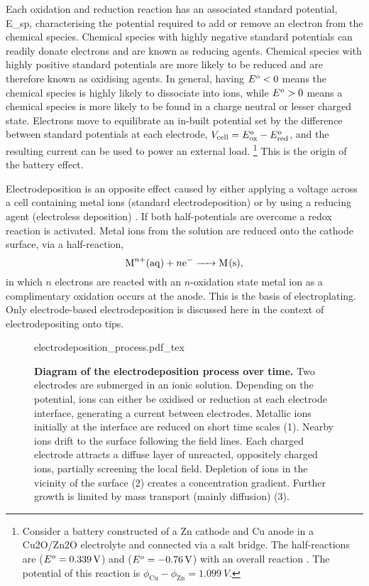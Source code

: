 \documentclass{article}
\begin{document}
Each oxidation and reduction reaction has an associated standard potential, \gls{E_sp}, characterising the  potential required to add or remove an electron from the chemical species. Chemical species with highly negative standard potentials can readily donate electrons and are known as reducing agents. Chemical species with highly positive standard potentials are more likely to be reduced and are therefore known as oxidising agents. In general, having $E^o<0$ means the chemical species is highly likely to dissociate into ions, while $E^o>0$ means a chemical species is more likely to be found in a charge neutral or lesser charged state.
Electrons move to equilibrate an in-built potential set by the difference between standard potentials at each electrode, $V_{\mathrm{cell}} = E^o_{\mathrm{ox}}-E^o_{\mathrm{red}}$, and the resulting current can be used to power an external load.%
\footnote{Consider a battery constructed of a Zn cathode and Cu anode in a Cu\subs2O/Zn\subs2O electrolyte and connected via a salt bridge. The half-reactions are  ($E^o=\SI{0.339}{V}$) and  ($E^o=\SI{-0.76}{V}$) with an overall reaction . The potential of this reaction is $\phi_{\mathrm{Cu}}-\phi_{\mathrm{Zn}}=\SI{1.099}{V}$.}
This is the origin of the battery effect.

Electrodeposition is an opposite effect caused by either applying a voltage across a cell containing metal ions (standard electrodeposition) or by using a reducing agent (electroless deposition) \cite{paunovic2006fundamentals}. If both half-potentials are overcome a redox reaction is activated. Metal ions from the solution are reduced onto the cathode surface, via a half-reaction,
\begin{equation} \ce{M^{$n$+}(aq) + $n$e- -> M(s)}, \end{equation}
in which $n$ electrons are reacted with an $n$-oxidation state metal ion as a complimentary oxidation occurs at the anode. This is the basis of electroplating. Only electrode-based electrodeposition is discussed here in the context of electrodepositing onto tips.

\begin{figure}[bt]
{\fontsize{10pt}{1em}\selectfont \def\svgwidth{0.9\textwidth} {electrodeposition_process.pdf_tex}}
\caption[Diagram of the electrodeposition process over time.]{\textbf{Diagram of the electrodeposition process over time.} Two electrodes are submerged in an ionic solution. Depending on the potential, ions can either be oxidised or reduction at each electrode interface, generating a current between electrodes. Metallic ions initially at the interface are reduced on short time scales (1). Nearby ions drift to the surface following the field lines. Each charged electrode attracts a diffuse layer of unreacted, oppositely charged ions, partially screening the local field. Depletion of ions in the vicinity of the surface (2) creates a concentration gradient. Further growth is limited by mass transport (mainly diffusion) (3).}
\label{fig:electrodeposition_process}
\end{figure}
\end{document}
